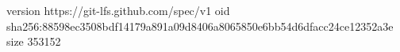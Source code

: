 version https://git-lfs.github.com/spec/v1
oid sha256:88598ec3508bdf14179a891a09d8406a8065850e6bb54d6dfacc24ce12352a3e
size 353152
